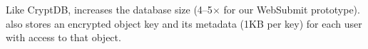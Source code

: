 %

%
%

Like CryptDB, \syscrypt increases the database size (4--5$\times$ for our
WebSubmit prototype).
%
\syscrypt also stores an encrypted object key and its metadata (1KB per key) for
each user with access to that object.
